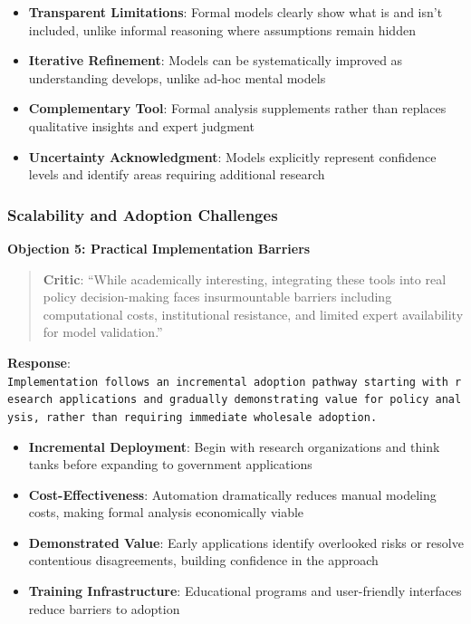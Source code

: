 \documentclass[
  11pt,
  letterpaper,
]{book}
\providecommand{\tightlist}{%
  \setlength{\itemsep}{0pt}\setlength{\parskip}{0pt}}
\begin{document}
\begin{itemize}
\tightlist
\item
  \textbf{Transparent Limitations}: Formal models clearly show what is
  and isn't included, unlike informal reasoning where assumptions remain
  hidden
\item
  \textbf{Iterative Refinement}: Models can be systematically improved
  as understanding develops, unlike ad-hoc mental models
\item
  \textbf{Complementary Tool}: Formal analysis supplements rather than
  replaces qualitative insights and expert judgment
\item
  \textbf{Uncertainty Acknowledgment}: Models explicitly represent
  confidence levels and identify areas requiring additional research
\end{itemize}

\subsubsection{Scalability and Adoption
Challenges}\label{sec-scalability-adoption}

\textbf{Objection 5: Practical Implementation Barriers}

\begin{quote}
\textbf{Critic}: ``While academically interesting, integrating these
tools into real policy decision-making faces insurmountable barriers
including computational costs, institutional resistance, and limited
expert availability for model validation.''
\end{quote}

\textbf{Response}:
\texttt{Implementation\ follows\ an\ incremental\ adoption\ pathway\ starting\ with\ research\ applications\ and\ gradually\ demonstrating\ value\ for\ policy\ analysis,\ rather\ than\ requiring\ immediate\ wholesale\ adoption.}

\begin{itemize}
\tightlist
\item
  \textbf{Incremental Deployment}: Begin with research organizations and
  think tanks before expanding to government applications
\item
  \textbf{Cost-Effectiveness}: Automation dramatically reduces manual
  modeling costs, making formal analysis economically viable
\item
  \textbf{Demonstrated Value}: Early applications identify overlooked
  risks or resolve contentious disagreements, building confidence in the
  approach
\item
  \textbf{Training Infrastructure}: Educational programs and
  user-friendly interfaces reduce barriers to adoption
\end{itemize}
\end{document}

